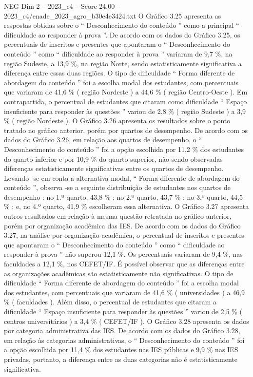 \begin{textsample}{NEG Dim 2 – 2023\_c4 – Score 24.00 – 2023\_c4/enade\_2023\_agro\_b30e4e3424.txt}
O Gráfico 3.25 apresenta as respostas obtidas sobre o “ Desconhecimento do conteúdo ” como a principal “ dificuldade ao responder à prova ”.
De acordo com os dados do Gráfico 3.25, os percentuais de inscritos e presentes que apontaram o “ Desconhecimento do conteúdo ” como “ dificuldade ao responder à prova ” variaram de 9,7 \%, na região Sudeste, a 13,9 \%, na região Norte, sendo estatisticamente significativa a diferença entre essas duas regiões.
O tipo de dificuldade “ Forma diferente de abordagem do conteúdo ” foi a escolha modal dos estudantes, com percentuais que variaram de 41,6 \% ( região Nordeste ) a 44,6 \% ( região Centro-Oeste ).
Em contrapartida, o percentual de estudantes que citaram como dificuldade “ Espaço insuficiente para responder às questões ” variou de 2,8 \% ( região Sudeste ) a 3,9 \% ( região Nordeste ).
O Gráfico 3.26 apresenta os resultados sobre o ponto tratado no gráfico anterior, porém por quartos de desempenho.
De acordo com os dados do Gráfico 3.26, em relação aos quartos de desempenho, o “ Desconhecimento do conteúdo ” foi a opção escolhida por 11,2 \% dos estudantes do quarto inferior e por 10,9 \% do quarto superior, não sendo observadas diferenças estatisticamente significativas entre os quartos de desempenho.
Levando -se em conta a alternativa modal, “ Forma diferente de abordagem do conteúdo ”, observa -se a seguinte distribuição de estudantes nos quartos de desempenho : no 1.º quarto, 43,8 \% ; no 2.º quarto, 43,7 \% ; no 3.º quarto, 44,5 \% ; e, no 4.º quarto, 41,9 \% escolheram essa alternativa.
O Gráfico 3.27 apresenta outros resultados em relação à mesma questão retratada no gráfico anterior, porém por organização acadêmica das IES.
De acordo com os dados do Gráfico 3.27, na análise por organização acadêmica, o percentual de inscritos e presentes que apontaram o “ Desconhecimento do conteúdo ” como “ dificuldade ao responder à prova ” não superou 12,1 \%.
Os percentuais variaram de 9,4 \%, nas faculdades a 12,1 \%, nos CEFET/IF.
É possível observar que as diferenças entre as organizações acadêmicas são estatisticamente não significativas.
O tipo de dificuldade “ Forma diferente de abordagem do conteúdo ” foi a escolha modal dos estudantes, com percentuais que variaram de 41,6 \% ( universidades ) a 46,9 \% ( faculdades ).
Além disso, o percentual de estudantes que citaram a dificuldade “ Espaço insuficiente para responder às questões ” variou de 2,5 \% ( centros universitários ) a 3,4 \% ( CEFET/IF ).
O Gráfico 3.28 apresenta os dados por categoria administrativa das IES.
De acordo com os dados do Gráfico 3.28, em relação às categorias administrativas, o “ Desconhecimento do conteúdo ” foi a opção escolhida por 11,4 \% dos estudantes nas IES públicas e 9,9 \% nas IES privadas, portanto, a diferença entre as duas categorias não é estatisticamente significativa.

\end{textsample}
